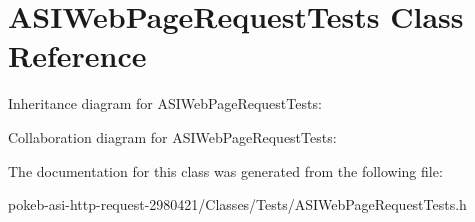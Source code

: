 \hypertarget{interface_a_s_i_web_page_request_tests}{
\section{\-A\-S\-I\-Web\-Page\-Request\-Tests \-Class \-Reference}
\label{interface_a_s_i_web_page_request_tests}
}


\-Inheritance diagram for \-A\-S\-I\-Web\-Page\-Request\-Tests\-:


\-Collaboration diagram for \-A\-S\-I\-Web\-Page\-Request\-Tests\-:


\-The documentation for this class was generated from the following file\-:\begin{DoxyCompactItemize}
\item 
pokeb-\/asi-\/http-\/request-\/2980421/\-Classes/\-Tests/\-A\-S\-I\-Web\-Page\-Request\-Tests.\-h\end{DoxyCompactItemize}
